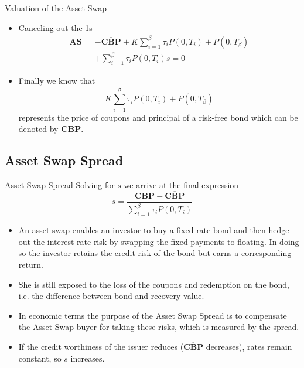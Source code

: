 \documentclass{beamer}
\begin{document}
\begin{frame}{Valuation of the Asset Swap}
	\begin{itemize}
		\item Canceling out the 1s
		\begin{equation*}
			\begin{aligned}
				\textbf{AS}=&-\overline{\textbf{CBP}}+K\sum_{i=1}^\beta\tau_i P(0,T_i) +P(0,T_\beta) \\
				& + \sum_{i=1}^{\beta}\tau_i P(0,T_i)s=0
			\end{aligned}
		\end{equation*}
		\item Finally we know that
		\begin{equation*}
			K\sum_{i=1}^\beta\tau_i P(0,T_i) + P(0,T_\beta)
		\end{equation*}
		represents the price of coupons and principal of a  risk-free bond which can be denoted by \textbf{CBP}.
	\end{itemize}
\end{frame}

\subsection{Asset Swap Spread}
\begin{frame}{Asset Swap Spread}
	Solving for $s$ we arrive at the final expression
	\begin{equation}
		s = \frac{\textbf{CBP}-\overline{\textbf{CBP}}}{\sum_{i=1}^{\beta}\tau_iP(0,T_i)}
	\end{equation}
	\begin{itemize}
	\item<2-> An asset swap enables an investor to buy a fixed rate bond and then hedge out the interest rate risk by swapping the fixed payments to floating. In doing so the investor retains the credit risk of the bond but earns a corresponding return. 
	\item<3-> She is still exposed to the loss of the coupons and redemption on the bond, i.e. the difference between bond and recovery value.
	\item<4-> In economic terms the purpose of the Asset Swap Spread is to compensate the Asset Swap buyer for taking these risks, which is measured by the spread.
	\item<5-> If the credit worthiness of the issuer reduces ($\overline{\textbf{CBP}}$ decreases), rates remain constant, so $s$ increases.
	\end{itemize}
\end{frame}
\end{document}

